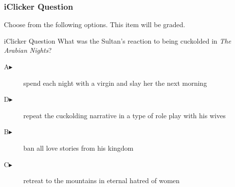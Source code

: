 \begin{frame}
  \frametitle{iClicker Question}
Choose from the following options. This item will be graded.
\begin{block}{iClicker Question}
What was the Sultan's reaction to being cuckolded in \emph{The Arabian
Nights}?
\end{block}
\begin{description}
\item[A\hspace{.2in}$\blacktriangleright$] spend each night with a virgin and slay her the next morning
\item[D\hspace{.2in}$\blacktriangleright$] repeat the cuckolding narrative in a type of role play with his wives
\item[B\hspace{.2in}$\blacktriangleright$] ban all love stories from his kingdom
\item[C\hspace{.2in}$\blacktriangleright$] retreat to the mountains in eternal hatred of women
\end{description}
\end{frame}
